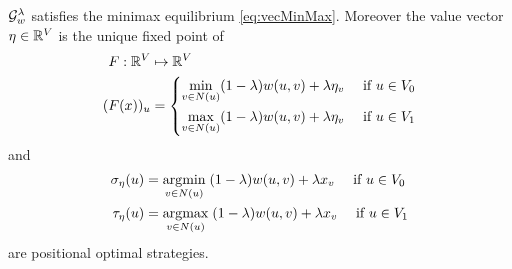 \begin{theorem}
    \label{thm:disc-minimax}
$\mathcal{G}^\lambda_w$ satisfies the minimax equilibrium \eqref{eq:vecMinMax}. Moreover the value vector $\eta \in \mathbb{R}^V$ is the unique fixed point of
\begin{align}
    F : \mathbb{R}^V &\mapsto \mathbb{R}^V \label{eq:aux-disc-func}\\
    (F(x))_u &= \begin{dcases}
    \min_{v \in N(u)} (1-\lambda) w(u,v) + \lambda \eta_v & \text{ if } u \in V_0\\
    \max_{v \in N(u)} (1-\lambda) w(u,v) + \lambda \eta_v & \text{ if } u \in V_1\\
    \end{dcases}\nonumber
\end{align}
and
\begin{equation}
\begin{aligned}
    \sigma_\eta(u) &= \operatorname*{arg\!\min}_{ v \in N(u)}\; (1-\lambda) w(u,v) + \lambda x_v \quad \text{ if } u \in V_0\\
    \tau_\eta(u) &= \operatorname*{arg\!\max}_{ v \in N(u)}\; (1-\lambda) w(u,v) + \lambda x_v   \quad \text{ if } u \in V_1
\end{aligned} \label{eq:opt-strategies-disc}
\end{equation}
are positional optimal strategies.
\end{theorem}
